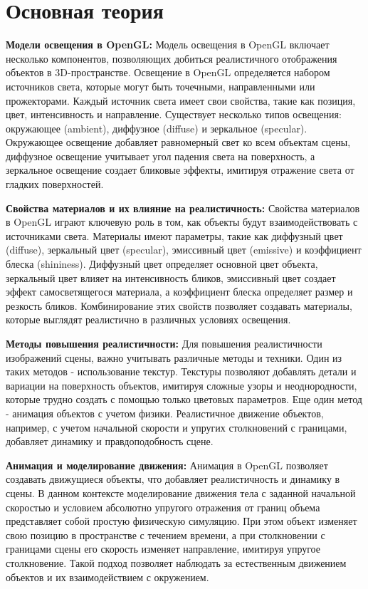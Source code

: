 \documentclass[a4paper, 14pt]{extarticle}
\begin{document}
\section{Основная теория}
\par
\textbf{Модели освещения в OpenGL:} Модель освещения в OpenGL включает несколько компонентов, позволяющих добиться реалистичного отображения объектов в 3D-пространстве. Освещение в OpenGL определяется набором источников света, которые могут быть точечными, направленными или прожекторами. Каждый источник света имеет свои свойства, такие как позиция, цвет, интенсивность и направление. Существует несколько типов освещения: окружающее (ambient), диффузное (diffuse) и зеркальное (specular). Окружающее освещение добавляет равномерный свет ко всем объектам сцены, диффузное освещение учитывает угол падения света на поверхность, а зеркальное освещение создает бликовые эффекты, имитируя отражение света от гладких поверхностей.
\par
\textbf{Свойства материалов и их влияние на реалистичность:} Свойства материалов в OpenGL играют ключевую роль в том, как объекты будут взаимодействовать с источниками света. Материалы имеют параметры, такие как диффузный цвет (diffuse), зеркальный цвет (specular), эмиссивный цвет (emissive) и коэффициент блеска (shininess). Диффузный цвет определяет основной цвет объекта, зеркальный цвет влияет на интенсивность бликов, эмиссивный цвет создает эффект самосветящегося материала, а коэффициент блеска определяет размер и резкость бликов. Комбинирование этих свойств позволяет создавать материалы, которые выглядят реалистично в различных условиях освещения.
\par
\textbf{Методы повышения реалистичности:} Для повышения реалистичности изображений сцены, важно учитывать различные методы и техники. Один из таких методов - использование текстур. Текстуры позволяют добавлять детали и вариации на поверхность объектов, имитируя сложные узоры и неоднородности, которые трудно создать с помощью только цветовых параметров. Еще один метод - анимация объектов с учетом физики. Реалистичное движение объектов, например, с учетом начальной скорости и упругих столкновений с границами, добавляет динамику и правдоподобность сцене.
\par
\textbf{Анимация и моделирование движения:} Анимация в OpenGL позволяет создавать движущиеся объекты, что добавляет реалистичность и динамику в сцены. В данном контексте моделирование движения тела с заданной начальной скоростью и условием абсолютно упругого отражения от границ объема представляет собой простую физическую симуляцию. При этом объект изменяет свою позицию в пространстве с течением времени, а при столкновении с границами сцены его скорость изменяет направление, имитируя упругое столкновение. Такой подход позволяет наблюдать за естественным движением объектов и их взаимодействием с окружением.
\end{document}
